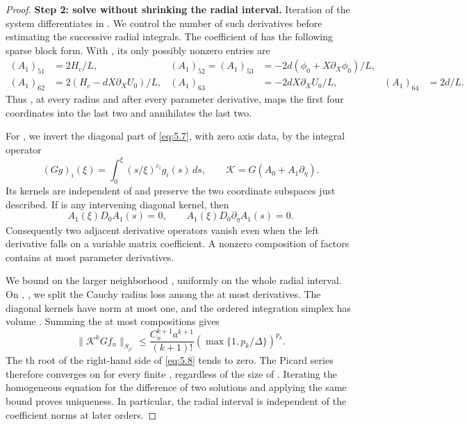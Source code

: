\begin{proof}
\textbf{Step 2: solve without shrinking the radial interval.} Iteration of the
system differentiates in . We control the number of
such derivatives before estimating the successive radial integrals. The
coefficient of  has the following sparse
block form. With , its only possibly
nonzero entries are
\begin{align*}
(A_1)_{51}&=2H_c/L,
& (A_1)_{52}=(A_1)_{53}&=-2d(\phi_0+X\partial_X\phi_0)/L,\\
(A_1)_{62}&=2(H_c-dX\partial_XU_0)/L,
& (A_1)_{63}&=-2dX\partial_XU_0/L,
& (A_1)_{64}&=2d/L.
\end{align*}
Thus , at every radius and after every parameter
derivative, maps the first four coordinates into the last two and annihilates
the last two.

For , we invert the diagonal part of
\eqref{eq:5.7}, with zero axis data, by the integral operator
\[
(Gg)_i(\xi)=\int_0^\xi(s/\xi)^{c_i}g_i(s)\,ds,
\qquad \mathcal K=G(A_0+A_1\partial_\eta).
\]
Its kernels are independent of  and preserve the two
coordinate subspaces just described. If  is any
intervening diagonal kernel, then
\[
A_1(\xi)D_0A_1(s)=0,
\qquad A_1(\xi)D_0\partial_\eta A_1(s)=0.
\]
Consequently two adjacent derivative operators vanish even when the left
derivative falls on a variable matrix coefficient. A nonzero composition of
 factors contains at most
 parameter derivatives.

We bound  on the larger neighborhood
, uniformly on the whole radial interval. On
, , we split
the Cauchy radius loss  among the at
most  derivatives. The diagonal kernels have norm at
most one, and the ordered integration simplex has volume
. Summing the at most
 compositions gives
\begin{equation}
\label{eq:5.8}
\lVert\mathcal K^kGf_n\rVert_{S_{\rho'}}
\le \frac{C_n^{k+1}a^{k+1}}{(k+1)!}
\left(\max\{1,p_k/\Delta\}\right)^{p_k}.
\tag{5.8}
\end{equation}
The th root of the right-hand side of \eqref{eq:5.8}
tends to zero. The Picard series
 therefore converges on
 for every finite ,
regardless of the size of . Iterating the homogeneous
equation for the difference of two solutions and applying the same bound proves
uniqueness. In particular, the radial interval is independent of the
coefficient norms at later orders.


\end{proof}
